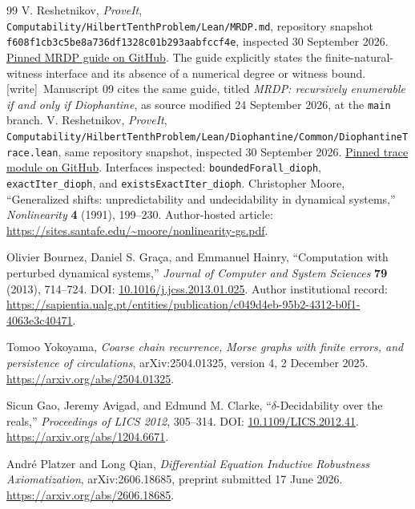 \documentclass[11pt,letterpaper]{article}
\numberwithin{equation}{section}
\theoremstyle{definition}
\theoremstyle{remark}
\newcommand{\code}[1]{\nolinkurl{#1}}
\newcommand{\wtag}{\textup{[write]}}
\newcommand{\snapshot}{\texttt{f608f1cb3c5be8a736df1328c01b293aabfccf4e}}
\newcommand{\repocommit}{\snapshot}
\begin{document}
\begin{thebibliography}{99}
V. Reshetnikov, \emph{ProveIt},
\code{Computability/HilbertTenthProblem/Lean/MRDP.md},
repository snapshot \repocommit, inspected 30 September 2026.
\href{https://github.com/VladimirReshetnikov/ProveIt/blob/f608f1cb3c5be8a736df1328c01b293aabfccf4e/Computability/HilbertTenthProblem/Lean/MRDP.md}{Pinned MRDP guide on GitHub}.
The guide explicitly states the finite-natural-witness interface and its absence of a numerical degree or witness bound.
\wtag\ Manuscript 09 cites the same guide, titled \emph{MRDP: recursively
enumerable if and only if Diophantine}, as source modified 24 September
2026, at the \code{main} branch.
V. Reshetnikov, \emph{ProveIt},
\code{Computability/HilbertTenthProblem/Lean/Diophantine/Common/DiophantineTrace.lean},
same repository snapshot, inspected 30 September 2026.
\href{https://github.com/VladimirReshetnikov/ProveIt/blob/f608f1cb3c5be8a736df1328c01b293aabfccf4e/Computability/HilbertTenthProblem/Lean/Diophantine/Common/DiophantineTrace.lean}{Pinned trace module on GitHub}.
Interfaces inspected: \code{boundedForall_dioph}, \code{exactIter_dioph}, and \code{existsExactIter_dioph}.
Christopher Moore, ``Generalized shifts: unpredictability and undecidability
in dynamical systems,'' \emph{Nonlinearity} \textbf{4} (1991), 199--230.
Author-hosted article:
\url{https://sites.santafe.edu/~moore/nonlinearity-gs.pdf}.

Olivier Bournez, Daniel S. Gra\c{c}a, and Emmanuel Hainry,
``Computation with perturbed dynamical systems,''
\emph{Journal of Computer and System Sciences} \textbf{79} (2013), 714--724.
DOI: \href{https://doi.org/10.1016/j.jcss.2013.01.025}{10.1016/j.jcss.2013.01.025}.
Author institutional record:
\url{https://sapientia.ualg.pt/entities/publication/c049d4eb-95b2-4312-b0f1-4063e3c40471}.

Tomoo Yokoyama, \emph{Coarse chain recurrence, Morse graphs with finite errors,
and persistence of circulations}, arXiv:2504.01325, version 4,
2 December 2025.
\url{https://arxiv.org/abs/2504.01325}.

Sicun Gao, Jeremy Avigad, and Edmund M. Clarke,
``$\delta$-Decidability over the reals,''
\emph{Proceedings of LICS 2012}, 305--314.
DOI: \href{https://doi.org/10.1109/LICS.2012.41}{10.1109/LICS.2012.41}.
\url{https://arxiv.org/abs/1204.6671}.

Andr\'e Platzer and Long Qian,
\emph{Differential Equation Inductive Robustness Axiomatization},
arXiv:2606.18685, preprint submitted 17 June 2026.
\url{https://arxiv.org/abs/2606.18685}.


\end{thebibliography}
\end{document}

